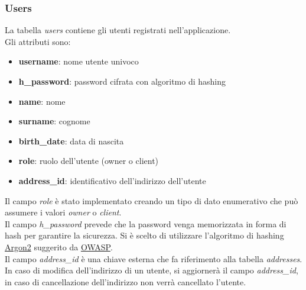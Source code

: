 \subsubsection{Users}
\label{sec:users}
La tabella \textit{users} contiene gli utenti registrati 
nell'applicazione.\\
Gli attributi sono:
\begin{itemize}
    \item \textbf{username}: nome utente univoco
    \item \textbf{h\_password}: password cifrata con algoritmo di hashing
    \item \textbf{name}: nome
    \item \textbf{surname}: cognome
    \item \textbf{birth\_date}: data di nascita
    \item \textbf{role}: ruolo dell'utente (owner o client)
    \item \textbf{address\_id}: identificativo dell'indirizzo dell'utente
\end{itemize}
Il campo \textit{role} è stato implementato creando un tipo di 
dato enumerativo che può assumere i valori \textit{owner} o \textit{client}.\\
Il campo \textit{h\_password} prevede che la password venga 
memorizzata in forma di hash per garantire la sicurezza.
Si è scelto di utilizzare l'algoritmo di hashing 
\href{https://github.com/p-h-c/phc-winner-argon2}{Argon2} suggerito 
da \href{https://cheatsheetseries.owasp.org/cheatsheets/Password_Storage_Cheat_Sheet.html}{OWASP}.\\
Il campo \textit{address\_id} è una chiave esterna che fa riferimento 
alla tabella \textit{addresses}. 
In caso di modifica dell'indirizzo
di un utente, si aggiornerà il campo \textit{address\_id}, in caso 
di cancellazione dell'indirizzo non verrà cancellato l'utente.

